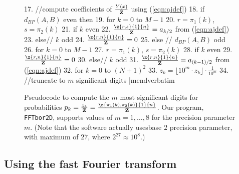 \begin{figure}[!h]
\begin{small}
17. //compute coefficients of $\frac{Y(x)}{{\bf Z}}$ using (\ref{eqn:ajdef})
18. if $d_{BP}(A,B)$ even then
19.   for $k=0$ to $M-1$
20.     $r=\pi_1(k)$, $s=\pi_2(k)$
21.     if $k$ even
22.       $\frac{\z{r,s}{1}{n}}{{\bf Z}} = a_{k/2}$ from (\ref{eqn:ajdef})
23.     else// $k$ odd
24.       $\frac{\z{r,n}{1}{n}}{{\bf Z}} = 0$
25. else // $d_{BP}(A,B)$ odd
26.   for $k=0$ to $M-1$
27.     $r=\pi_1(k)$, $s=\pi_2(k)$
28.     if $k$ even
29.       $\frac{\z{r,n}{1}{n}}{{\bf Z}} = 0$
30.     else// $k$ odd
31.       $\frac{\z{r,n}{1}{n}}{{\bf Z}} = a_{(k-1)/2}$ from (\ref{eqn:ajdef})
32.  for $k=0$ to $(N+1)^2$
33.    $z_k = \lfloor 10^m \cdot z_k \rfloor \cdot \frac{1}{10^m}$
34.    //truncate to $m$ significant digits
|mendverbatim
\end{small}
\caption{\small
Pseudocode to compute the $m$ most significant digits
for probabilities
$p_k = \frac{z_{k}}{{\bf Z}}=\frac{\z{\pi_1(k),\pi_2(k)}{1}{n}}{{\bf Z}}$.
Our program, {\tt FFTbor2D}, supports values of $m = 1,\ldots,8$ for the
precision parameter $m$.
(Note that the software actually usesbase $2$ precision parameter, with maximum of $27$, where $2^{27} \approx
10^8$.)
}
\label{pseudocode:interpolatingP}
\end{figure}


\subsection{Using the fast Fourier transform}
\label{section:FFT}

